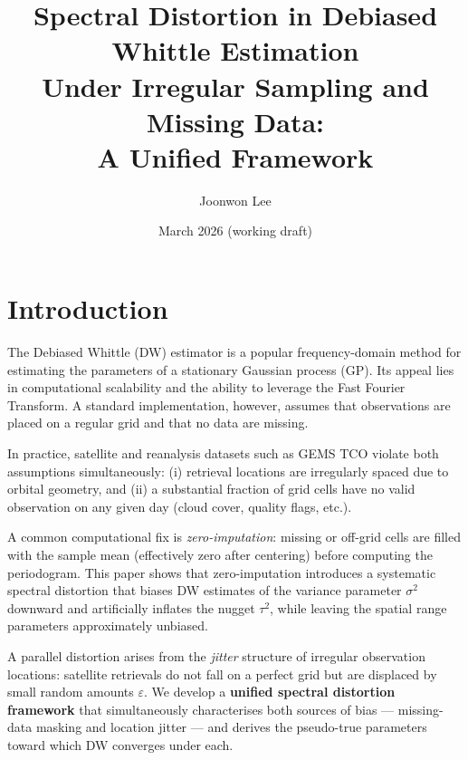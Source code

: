 \documentclass[12pt]{article}
\title{Spectral Distortion in Debiased Whittle Estimation\\
Under Irregular Sampling and Missing Data:\\
A Unified Framework}
\author{Joonwon Lee}
\date{March 2026 (working draft)}
\begin{document}
\maketitle
\tableofcontents
\bigskip

\section{Introduction}

The Debiased Whittle (DW) estimator \citep{Sykulski2019} is a popular
frequency-domain method for estimating the parameters of a stationary
Gaussian process (GP). Its appeal lies in computational scalability and
the ability to leverage the Fast Fourier Transform.
A standard implementation, however, assumes that observations are placed
on a regular grid and that no data are missing.

In practice, satellite and reanalysis datasets such as GEMS TCO violate
both assumptions simultaneously: (i) retrieval locations are irregularly
spaced due to orbital geometry, and (ii) a substantial fraction of
grid cells have no valid observation on any given day (cloud cover,
quality flags, etc.).

A common computational fix is \emph{zero-imputation}: missing or
off-grid cells are filled with the sample mean (effectively zero after
centering) before computing the periodogram.
This paper shows that zero-imputation introduces a systematic
spectral distortion that biases DW estimates of the variance parameter
$\sigma^2$ downward and artificially inflates the nugget $\tau^2$,
while leaving the spatial range parameters approximately unbiased.

A parallel distortion arises from the \emph{jitter} structure of
irregular observation locations: satellite retrievals do not fall on a
perfect grid but are displaced by small random amounts $\varepsilon$.
We develop a \textbf{unified spectral distortion framework} that
simultaneously characterises both sources of bias — missing-data masking
and location jitter — and derives the pseudo-true parameters toward
which DW converges under each.
\end{document}
